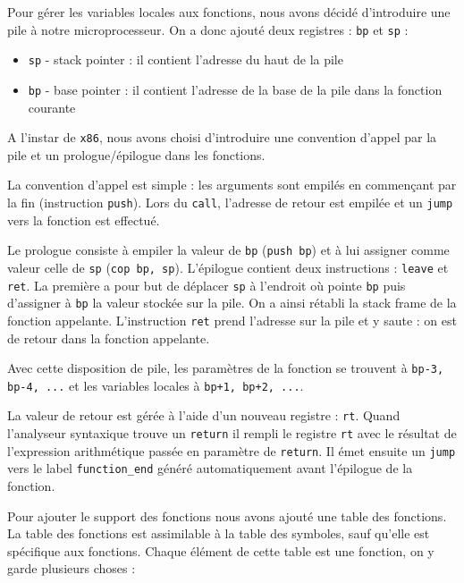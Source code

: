     Pour gérer les variables locales aux fonctions, nous avons décidé d'introduire une pile à notre microprocesseur. On a donc ajouté deux registres : \texttt{bp} et \texttt{sp} :
    
    \begin{itemize}
        \item \texttt{sp} - stack pointer : il contient l'adresse du haut de la pile
        \item \texttt{bp} - base pointer : il contient l'adresse de la base de la pile dans la fonction courante
    \end{itemize}
    
    A l'instar de \texttt{x86}, nous avons choisi d'introduire une convention d'appel par la pile et un prologue/épilogue dans les fonctions.
    
    La convention d'appel est simple : les arguments sont empilés en commençant par la fin (instruction \texttt{push}). Lors du \texttt{call}, l'adresse de retour est empilée et un \texttt{jump} vers la fonction est effectué.
    
    Le prologue consiste à empiler la valeur de \texttt{bp} (\texttt{push bp}) et à lui assigner comme valeur celle de \texttt{sp} (\texttt{cop bp, sp}). L'épilogue contient deux instructions : \texttt{leave} et \texttt{ret}. La première a pour but de déplacer \texttt{sp} à l'endroit où pointe \texttt{bp} puis d'assigner à \texttt{bp} la valeur stockée sur la pile. On a ainsi rétabli la stack frame de la fonction appelante. L'instruction \texttt{ret} prend l'adresse sur la pile et y saute : on est de retour dans la fonction appelante.
    
    Avec cette disposition de pile, les paramètres de la fonction se trouvent à \texttt{bp-3, bp-4, ...} et les variables locales à \texttt{bp+1, bp+2, ...}.

    La valeur de retour est gérée à l'aide d'un nouveau registre : \texttt{rt}. Quand l'analyseur syntaxique trouve un \texttt{return} il rempli le registre \texttt{rt} avec le résultat de l'expression arithmétique passée en paramètre de \texttt{return}. Il émet ensuite un \texttt{jump} vers le label \texttt{function\_end} généré automatiquement avant l'épilogue de la fonction.

    Pour ajouter le support des fonctions nous avons ajouté une table des fonctions. La table des fonctions est assimilable à la table des symboles, sauf qu'elle est spécifique aux fonctions. Chaque élément de cette table est une fonction, on y garde plusieurs choses :
    
